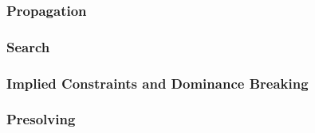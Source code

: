 


\subsubsection{Propagation}




\subsubsection{Search}




\subsubsection{Implied Constraints and Dominance Breaking}




\subsubsection{Presolving}


